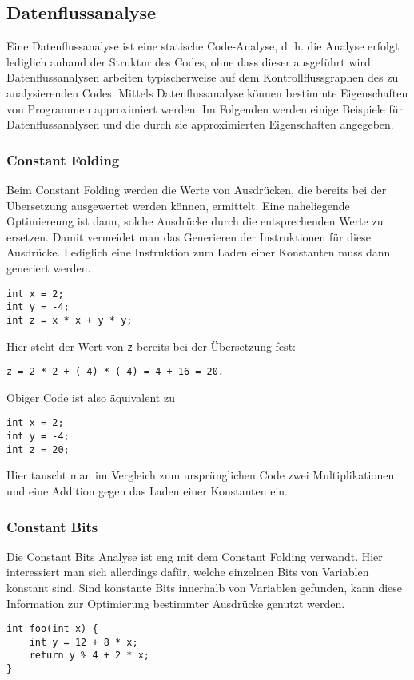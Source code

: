 \subsection{Datenflussanalyse}
Eine Datenflussanalyse ist eine statische Code-Analyse, d. h. die Analyse erfolgt lediglich anhand der Struktur des Codes, ohne dass dieser ausgeführt wird. Datenflussanalysen arbeiten typischerweise auf dem Kontrollflussgraphen des zu analysierenden Codes.
Mittels Datenflussanalyse können bestimmte Eigenschaften von Programmen approximiert werden.
Im Folgenden werden einige Beispiele für Datenflussanalysen und die durch sie approximierten Eigenschaften angegeben.

\subsubsection{Constant Folding}
Beim Constant Folding werden die Werte von Ausdrücken, die bereits bei der Übersetzung ausgewertet werden können, ermittelt.
Eine naheliegende Optimiereung ist dann, solche Ausdrücke durch die entsprechenden Werte zu ersetzen.
Damit vermeidet man das Generieren der Instruktionen für diese Ausdrücke. Lediglich eine Instruktion zum Laden einer Konstanten muss dann generiert werden.
\begin{lstlisting}[frame=single]
int x = 2;
int y = -4;
int z = x * x + y * y; 
\end{lstlisting}
Hier steht der Wert von \lstinline{z} bereits bei der Übersetzung fest:
\begin{lstlisting}[numbers=none]
z = 2 * 2 + (-4) * (-4) = 4 + 16 = 20.
\end{lstlisting}
Obiger Code ist also äquivalent zu
\begin{lstlisting}[frame=single]
int x = 2;
int y = -4;
int z = 20; 
\end{lstlisting}
Hier tauscht man im Vergleich zum ursprünglichen Code zwei Multiplikationen und eine Addition gegen das Laden einer Konstanten ein.

\subsubsection{Constant Bits}
Die Constant Bits Analyse ist eng mit dem Constant Folding verwandt. 
Hier interessiert man sich allerdings dafür, welche einzelnen Bits von Variablen konstant sind.
Sind konstante Bits innerhalb von Variablen gefunden, kann diese Information zur Optimierung bestimmter Ausdrücke genutzt werden.
\begin{lstlisting}[frame=single]
int foo(int x) {
	int y = 12 + 8 * x;
	return y % 4 + 2 * x;
} 
\end{lstlisting}

